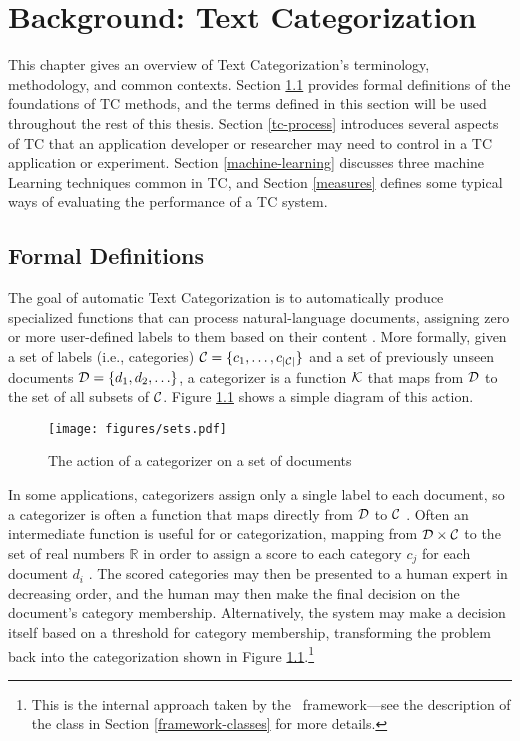 \chapter{Background: Text Categorization}
\label{background-tc}

This chapter gives an overview of Text Categorization's terminology,
methodology, and common contexts.  Section \ref{formal-defs} provides
formal definitions of the foundations of TC methods, and the terms
defined in this section will be used throughout the rest of this
thesis.  Section \ref{tc-process} introduces several aspects of TC
that an application developer or researcher may need to control in a
TC application or experiment.  Section \ref{machine-learning}
discusses three machine Learning techniques common in TC, and Section
\ref{measures} defines some typical ways of evaluating the performance
of a TC system.


\section{Formal Definitions}
\label{formal-defs}

The goal of automatic Text Categorization is to automatically produce
specialized functions that can process natural-language documents,
assigning zero or more user-defined labels to them based on their
content \cite[p. 3]{sebastiani:02} \cite[ch. 16]{manning:99}
\cite[sec. 6.10]{mitchell:97}.  More formally, given a set of labels
(i.e., categories) $\mathcal{C} = \{c_1, \ldots, c_{|\mathcal{C}|}\}$ and a set of
previously unseen documents $\mathcal{D} = \{d_1, d_2, \ldots \}$, a categorizer is a
function $\mathcal{K}$ that maps from $\mathcal{D}$ to the set of all subsets of
$\mathcal{C}$.  Figure \ref{sets} shows a simple diagram of this action.

\begin{figure}
\begin{center}
\texttt{[image: figures/sets.pdf]}
\caption{The action of a categorizer on a set of documents}
\label{sets}
\end{center}
\end{figure}

In some applications, categorizers assign only a single label to each
document, so a categorizer is often a function that maps directly from
$\mathcal{D}$ to $\mathcal{C}$ \cite[p. 3]{sebastiani:02}. Often an intermediate
function is useful for  or 
categorization, mapping from $\mathcal{D} \times \mathcal{C}$ to the set of real
numbers $\mathbb{R}$ in order to assign a score to each category $c_j$
for each document $d_i$ \cite[p. 4]{sebastiani:02}. The scored
categories may then be presented to a human expert in decreasing
order, and the human may then make the final decision on the
document's category membership.  Alternatively, the system may make a
decision itself based on a threshold for category membership,
transforming the problem back into the  categorization
shown in Figure \ref{sets}.\footnote{This is the internal approach
  taken by the \aicat\ framework---see the description of the
   class in Section \ref{framework-classes} for more
  details.}

